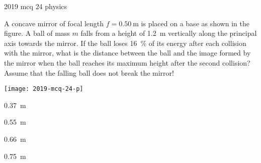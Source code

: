 \ylDisplay
{}%
{2019}%
{mcq}%
{24}%
{physics}%
{}%
{
\ifStatement
A concave mirror of focal length $f=\SI{0.50}{\m}$ is placed on a base as shown in the figure. A ball of mass $m$ falls from a height of \SI{1.2}{\m} vertically along the principal axis towards the mirror. If the  ball loses \SI{16}{\percent} of its energy after each collision with the mirror,  what is the distance between the ball and the image formed by the  mirror when the ball reaches its maximum height after the second  collision? Assume that the falling ball does not break the mirror!
\begin{center}
  \texttt{[image: 2019-mcq-24-p]}
\end{center}
\fi


\SI{0.37}{\m}
\fi


\SI{0.55}{\m}
\fi


\SI{0.66}{\m}
\fi


\SI{0.75}{\m}
\fi


\ifHint

\fi


\ifSolution

\fi


\ifEstStatement

\fi



\fi



\fi



\fi



\fi


\ifEstHint

\fi


\ifEstSolution

\fi
}
